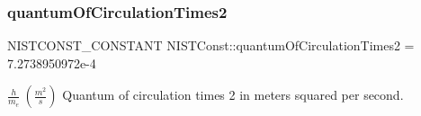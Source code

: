 \subsubsection{\texorpdfstring{quantum\+Of\+Circulation\+Times2}{quantumOfCirculationTimes2}}
{\footnotesize\ttfamily N\+I\+S\+T\+C\+O\+N\+S\+T\+\_\+\+C\+O\+N\+S\+T\+A\+NT N\+I\+S\+T\+Const\+::quantum\+Of\+Circulation\+Times2 = 7.\+2738950972e-\/4}

$\frac{h}{m_e} \ (\frac{m^2}{s})$ Quantum of circulation times 2 in meters squared per second. 